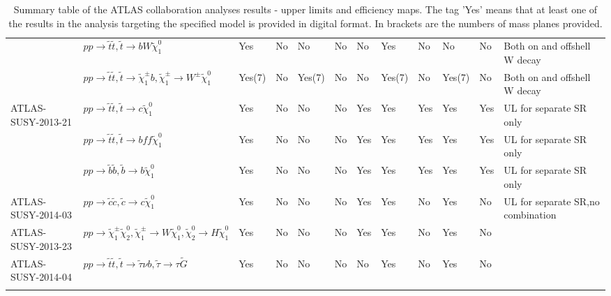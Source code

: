 \documentclass[11pt,A4paper]{article}
\begin{document}
\begin{landscape}
\begin{longtable} {|l|l|l|l|l|l|l|l|l|l|l|l|}
 & $pp \rightarrow \tilde{t} \tilde{t}, \tilde{t}\rightarrow b W \tilde{\chi}_1 ^0 $ & Yes & No & No & No & No & Yes & No & No & No & Both on and offshell W decay \\
  & $pp \rightarrow \tilde{t} \tilde{t}, \tilde{t}\rightarrow \tilde{\chi}_1 ^{\pm} b,\tilde{\chi}_1 ^{\pm} \rightarrow W^{\pm} \tilde{\chi}_1 ^0$ & Yes(7) & No & Yes(7) & No & No & Yes(7) & No & Yes(7) & No & Both on and offshell W decay\\ \hline
ATLAS-SUSY-2013-21 & $pp \rightarrow \tilde{t} \tilde{t}, \tilde{t}\rightarrow c  \tilde{\chi}_1 ^0 $ & Yes & No & No & No & Yes & Yes & Yes & Yes & Yes & UL for separate SR only\\
 & $pp \rightarrow \tilde{t} \tilde{t}, \tilde{t} \rightarrow b  f f\tilde{\chi}_1 ^0 $ & Yes & No & No & No & Yes & Yes & Yes & Yes & Yes & UL for separate SR only\\
  & $pp \rightarrow \tilde{b} \tilde{b}, \tilde{b}\rightarrow b  \tilde{\chi}_1 ^0 $ & Yes & No & No & No & Yes & Yes & Yes & Yes & Yes & UL for separate SR only\\ \hline
ATLAS-SUSY-2014-03 & $pp \rightarrow \tilde{c} \tilde{c}, \tilde{c}\rightarrow c  \tilde{\chi}_1 ^0 $ & Yes & No & No & No & Yes & Yes & No & Yes & No & UL for separate SR,no combination\\ \hline
ATLAS-SUSY-2013-23 & $pp \rightarrow \tilde{\chi}_1 ^{\pm} \tilde{\chi}_2 ^0 , \tilde{\chi}_1 ^{\pm} \rightarrow W \tilde{\chi}_1 ^0 , \tilde{\chi}_2 ^0 \rightarrow H \tilde{\chi}_1 ^0$ & Yes & No & No & No & Yes & Yes & No & Yes & No & \\ \hline
ATLAS-SUSY-2014-04 & $pp \rightarrow \tilde{t} \tilde{t}, \tilde{t}\rightarrow \tilde{\tau} \nu b,\tilde{\tau} \rightarrow \tau \tilde{G}$ & Yes & No & No & No & No & Yes & No & Yes & No & \\ \hline

\caption{Summary table of the ATLAS collaboration analyses results - upper limits and efficiency maps. The tag 'Yes' means that at least one of the results in the analysis targeting the specified model is provided in digital format. In brackets are the numbers of mass planes provided.}
\end{longtable} 
\end{landscape}
\end{document}

